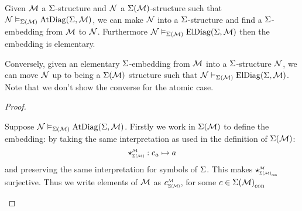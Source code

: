 \begin{prop}
    Given $\mathcal{M}$ a $\Sigma$-structure and 
    $\mathcal{N}$ a $\Sigma(\mathcal{M})$-structure such that
    $\mathcal{N} \vDash_{\Sigma(\mathcal{M})} \mathrm{AtDiag}(\Sigma,\mathcal{M})$,
    we can make $\mathcal{N}$ into a $\Sigma$-structure and find
    a $\Sigma$-embedding from $\mathcal{M}$ to $\mathcal{N}$.
    Furthermore
    $\mathcal{N} \vDash_{\Sigma(\mathcal{M})} \mathrm{ElDiag}(\Sigma,\mathcal{M})$ then 
    the embedding is elementary.

    Conversely, given an elementary $\Sigma$-embedding from 
    $\mathcal{M}$ into a $\Sigma$-structure $\mathcal{N}$, 
    we can move $\mathcal{N}$ up to being a $\Sigma(\mathcal{M})$ structure such that 
    $\mathcal{N} \vDash_{\Sigma(\mathcal{M})} \mathrm{ElDiag}(\Sigma,\mathcal{M})$.
    Note that we don't show the converse for the atomic case.%
\end{prop}
\begin{proof}
    \begin{forward}
        Suppose $\mathcal{N} \vDash_{\Sigma(\mathcal{M})} \mathrm{AtDiag}(\Sigma,\mathcal{M})$.
        Firstly we work in $\Sigma(\mathcal{M})$ to define the embedding:
        by taking the same interpretation as used in the 
        definition of $\Sigma(\mathcal{M})$: 
        \[\intp{\Si(\MM)}{\MM} : c_a \mapsto a\]
        and preserving the same interpretation for symbols of $\Sigma$.
        This makes $\intp{\const{\Si(\MM)}}{\MM}$ surjective.
        Thus we write elements of ${\mathcal{M}}$ as 
        $\subintp{\Si(\MM)}{\MM}{c}$, 
        for some $c \in {\Sigma(\mathcal{M})}_\mathrm{con}$
        

\end{forward}
\end{proof}
